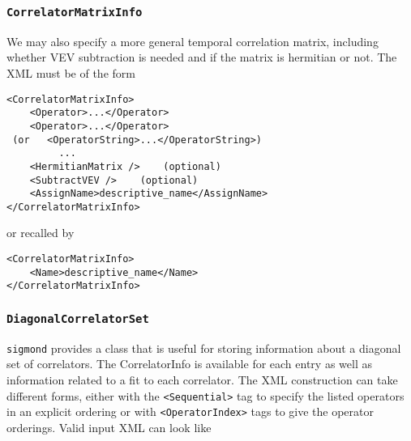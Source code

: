 \documentclass[12pt]{article}
\newcommand{\sigmond}{\texttt{sigmond} }
\newcommand{\vb}{\texttt}
\begin{document}
\subsubsection{\vb{CorrelatorMatrixInfo}}
We may also specify a more general temporal correlation matrix,
including whether VEV subtraction is needed and if the matrix is
hermitian or not. The XML must be of the form
\begin{verbatim}
<CorrelatorMatrixInfo>
    <Operator>...</Operator>
    <Operator>...</Operator>
 (or   <OperatorString>...</OperatorString>)
         ...
    <HermitianMatrix />    (optional)
    <SubtractVEV />    (optional)
    <AssignName>descriptive_name</AssignName>
</CorrelatorMatrixInfo>
\end{verbatim}
or recalled by
\begin{verbatim}
<CorrelatorMatrixInfo>
    <Name>descriptive_name</Name>
</CorrelatorMatrixInfo>
\end{verbatim}

\subsubsection{\vb{DiagonalCorrelatorSet}} \label{sec:diag_corr_set}
\sigmond provides a class that is useful for storing information
about a diagonal set of correlators. The CorrelatorInfo is
available for each entry as well as information related to a fit
to each correlator. The XML construction can take different forms,
either with the \vb{<Sequential>} tag to specify the listed
operators in an explicit ordering or with \vb{<OperatorIndex>}
tags to give the operator orderings. Valid input XML can look like
\end{document}
